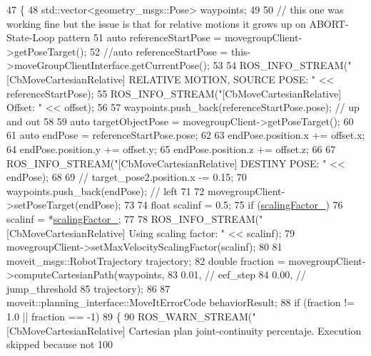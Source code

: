 \begin{DoxyCode}
47 \{
48   std::vector<geometry\_msgs::Pose> waypoints;
49 
50   \textcolor{comment}{// this one was working fine but the issue is that for relative motions it grows up on ABORT-State-Loop
       pattern}
51   \textcolor{keyword}{auto} referenceStartPose = movegroupClient->getPoseTarget(); 
52   \textcolor{comment}{//auto referenceStartPose = this->moveGroupClientInterface.getCurrentPose();}
53 
54   ROS\_INFO\_STREAM(\textcolor{stringliteral}{"[CbMoveCartesianRelative] RELATIVE MOTION, SOURCE POSE: "} << referenceStartPose);
55   ROS\_INFO\_STREAM(\textcolor{stringliteral}{"[CbMoveCartesianRelative] Offset: "} << offset);
56 
57   waypoints.push\_back(referenceStartPose.pose);  \textcolor{comment}{// up and out}
58 
59   \textcolor{keyword}{auto} targetObjectPose = movegroupClient->getPoseTarget();
60 
61   \textcolor{keyword}{auto} endPose = referenceStartPose.pose;
62 
63   endPose.position.x += offset.x;
64   endPose.position.y += offset.y;
65   endPose.position.z += offset.z;
66 
67   ROS\_INFO\_STREAM(\textcolor{stringliteral}{"[CbMoveCartesianRelative] DESTINY POSE: "} << endPose);
68 
69   \textcolor{comment}{// target\_pose2.position.x -= 0.15;}
70   waypoints.push\_back(endPose);  \textcolor{comment}{// left}
71 
72   movegroupClient->setPoseTarget(endPose);
73 
74   \textcolor{keywordtype}{float} scalinf = 0.5;
75   \textcolor{keywordflow}{if} (\hyperlink{classmoveit__z__client_1_1CbMoveCartesianRelative_a0d483fda685fe6ef7e68240ae5b2140d}{scalingFactor\_})
76     scalinf = *\hyperlink{classmoveit__z__client_1_1CbMoveCartesianRelative_a0d483fda685fe6ef7e68240ae5b2140d}{scalingFactor\_};
77 
78   ROS\_INFO\_STREAM(\textcolor{stringliteral}{"[CbMoveCartesianRelative] Using scaling factor: "} << scalinf);
79   movegroupClient->setMaxVelocityScalingFactor(scalinf);
80 
81   moveit\_msgs::RobotTrajectory trajectory;
82   \textcolor{keywordtype}{double} fraction = movegroupClient->computeCartesianPath(waypoints,
83                                                           0.01,  \textcolor{comment}{// eef\_step}
84                                                           0.00,  \textcolor{comment}{// jump\_threshold}
85                                                           trajectory);
86 
87   moveit::planning\_interface::MoveItErrorCode behaviorResult;
88   \textcolor{keywordflow}{if} (fraction != 1.0 || fraction == -1)
89   \{
90     ROS\_WARN\_STREAM(\textcolor{stringliteral}{"[CbMoveCartesianRelative] Cartesian plan joint-continuity percentaje. Execution
       skipped because not 100%
}
\end{DoxyCode}
